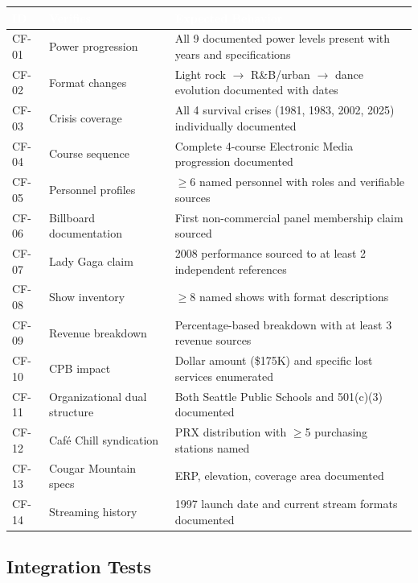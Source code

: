 \documentclass[11pt,letterpaper]{article}
\newcommand{\tableheader}[1]{\textbf{\sffamily\textcolor{white}{#1}}}
\begin{document}
\begin{center}
\begin{tabularx}{\textwidth}{C{1.2cm}L{3cm}X}
\toprule
{}
\tableheader{ID} & \tableheader{Verifies} & \tableheader{Expected Behavior} \\
\midrule
CF-01 & Power progression & All 9 documented power levels present with years and specifications \\
CF-02 & Format changes & Light rock $\rightarrow$ R\&B/urban $\rightarrow$ dance evolution documented with dates \\
CF-03 & Crisis coverage & All 4 survival crises (1981, 1983, 2002, 2025) individually documented \\
CF-04 & Course sequence & Complete 4-course Electronic Media progression documented \\
CF-05 & Personnel profiles & $\geq$6 named personnel with roles and verifiable sources \\
CF-06 & Billboard documentation & First non-commercial panel membership claim sourced \\
CF-07 & Lady Gaga claim & 2008 performance sourced to at least 2 independent references \\
CF-08 & Show inventory & $\geq$8 named shows with format descriptions \\
CF-09 & Revenue breakdown & Percentage-based breakdown with at least 3 revenue sources \\
CF-10 & CPB impact & Dollar amount (\$175K) and specific lost services enumerated \\
CF-11 & Organizational dual structure & Both Seattle Public Schools and 501(c)(3) documented \\
CF-12 & Café Chill syndication & PRX distribution with $\geq$5 purchasing stations named \\
CF-13 & Cougar Mountain specs & ERP, elevation, coverage area documented \\
CF-14 & Streaming history & 1997 launch date and current stream formats documented \\
\bottomrule
\end{tabularx}
\end{center}

\subsection{Integration Tests}
\end{document}
